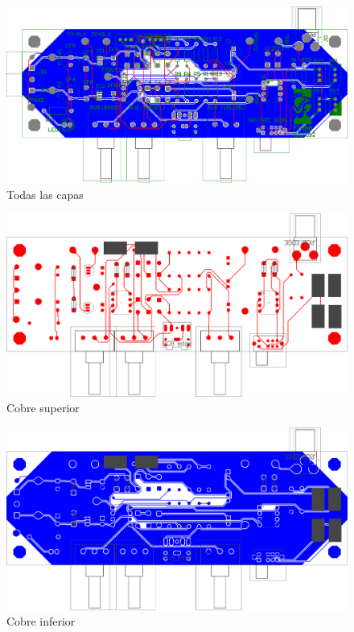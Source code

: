 \clearpage

\begin{figure}[H]
    \centering
    \includegraphics[width=150mm, angle=90]{img/PCB/layers/preamp/all-2D.png}
    \caption{\footnotesize{Todas las capas}}
    \label{fig:pcb_preamp_all}
\end{figure}

\clearpage

\begin{figure}[H]
    \centering
    \includegraphics[width=150mm, angle=90]{img/PCB/layers/preamp/top-copper.png}
    \caption{\footnotesize{Cobre superior}}
    \label{fig:pcb_preamp_top_copper}
\end{figure}

\clearpage

\begin{figure}[H]
    \centering
    \includegraphics[width=150mm, angle=90]{img/PCB/layers/preamp/bottom-copper.png}
    \caption{\footnotesize{Cobre inferior}}
    \label{fig:pcb_preamp_bottom_copper}
\end{figure}


